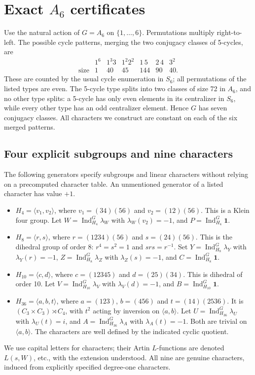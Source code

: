 \documentclass[11pt,letterpaper]{article}
\theoremstyle{remark}\newtheorem{remark}[theorem]{Remark}
\newcommand{\Ind}{\operatorname{Ind}}\newcommand{\Res}{\operatorname{Res}}\newcommand{\ord}{\operatorname{ord}}\newcommand{\reg}{\operatorname{reg}}\newcommand{\Gal}{\operatorname{Gal}}\newcommand{\Frob}{\operatorname{Frob}}\newcommand{\one}{\mathbf1}\newcommand{\RH}{\mathrm{RH}}
\begin{document}
\section{Exact \texorpdfstring{$A_6$}{A6} certificates}\label{sec:group}
Use the natural action of $G=A_6$ on $\{1,\dots,6\}$. Permutations multiply right-to-left. The possible cycle patterns, merging the two conjugacy classes of 5-cycles, are
\[
\begin{array}{c|rrrrrr}
 &1^6&1^3 3&1^2 2^2&1\,5&2\,4&3^2\\\hline
 \text{size}&1&40&45&144&90&40.
\end{array}
\]
These are counted by the usual cycle enumeration in $S_6$; all permutations of the listed types are even. The 5-cycle type splits into two classes of size 72 in $A_6$, and no other type splits: a 5-cycle has only even elements in its centralizer in $S_6$, while every other type has an odd centralizer element. Hence $G$ has seven conjugacy classes. All characters we construct are constant on each of the six merged patterns.

\subsection{Four explicit subgroups and nine characters}
The following generators specify subgroups and linear characters without relying on a precomputed character table. An unmentioned generator of a listed character has value $+1$.
\begin{itemize}
\item $H_4=\langle v_1,v_2\rangle$, where $v_1=(34)(56)$ and $v_2=(12)(56)$. This is a Klein four group. Let $W=\Ind_{H_4}^G\lambda_W$ with $\lambda_W(v_2)=-1$, and $P=\Ind_{H_4}^G\one$.
\item $H_8=\langle r,s\rangle$, where $r=(1234)(56)$ and $s=(24)(56)$. This is the dihedral group of order 8: $r^4=s^2=1$ and $srs=r^{-1}$. Set $Y=\Ind_{H_8}^G\lambda_Y$ with $\lambda_Y(r)=-1$, $Z=\Ind_{H_8}^G\lambda_Z$ with $\lambda_Z(s)=-1$, and $C=\Ind_{H_8}^G\one$.
\item $H_{10}=\langle c,d\rangle$, where $c=(12345)$ and $d=(25)(34)$. This is dihedral of order 10. Let $V=\Ind_{H_{10}}^G\lambda_V$ with $\lambda_V(d)=-1$, and $B=\Ind_{H_{10}}^G\one$.
\item $H_{36}=\langle a,b,t\rangle$, where $a=(123)$, $b=(456)$ and $t=(14)(2536)$. It is $(C_3\times C_3)\rtimes C_4$, with $t^2$ acting by inversion on $\langle a,b\rangle$. Let $U=\Ind_{H_{36}}^G\lambda_U$ with $\lambda_U(t)=i$, and $A=\Ind_{H_{36}}^G\lambda_A$ with $\lambda_A(t)=-1$. Both are trivial on $\langle a,b\rangle$. The characters are well defined by the indicated cyclic quotient.
\end{itemize}
We use capital letters for characters; their Artin $L$-functions are denoted $L(s,W)$, etc., with the extension understood. All nine are genuine characters, induced from explicitly specified degree-one characters.
\end{document}
